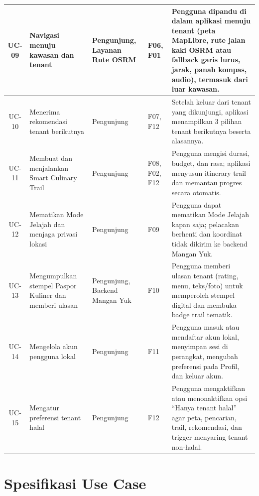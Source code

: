 \begin{longtable}{|C{0.10}|L{0.25}|L{0.14}|L{0.13}|L{0.38}|}
UC-09 & Navigasi menuju kawasan dan tenant & Pengunjung, Layanan Rute OSRM & F06, F01 & Pengguna dipandu di dalam aplikasi menuju tenant (peta MapLibre, rute jalan kaki OSRM atau fallback garis lurus, jarak, panah kompas, audio), termasuk dari luar kawasan. \\ \hline
UC-10 & Menerima rekomendasi tenant berikutnya & Pengunjung & F07, F12 & Setelah keluar dari tenant yang dikunjungi, aplikasi menampilkan 3 pilihan tenant berikutnya beserta alasannya. \\ \hline
UC-11 & Membuat dan menjalankan Smart Culinary Trail & Pengunjung & F08, F02, F12 & Pengguna mengisi durasi, budget, dan rasa; aplikasi menyusun itinerary trail dan memantau progres secara otomatis. \\ \hline
UC-12 & Mematikan Mode Jelajah dan menjaga privasi lokasi & Pengunjung & F09 & Pengguna dapat mematikan Mode Jelajah kapan saja; pelacakan berhenti dan koordinat tidak dikirim ke backend Mangan Yuk. \\ \hline
UC-13 & Mengumpulkan stempel Paspor Kuliner dan memberi ulasan & Pengunjung, Backend Mangan Yuk & F10 & Pengguna memberi ulasan tenant (rating, menu, teks/foto) untuk memperoleh stempel digital dan membuka badge trail tematik. \\ \hline
UC-14 & Mengelola akun pengguna lokal & Pengunjung & F11 & Pengguna masuk atau mendaftar akun lokal, menyimpan sesi di perangkat, mengubah preferensi pada Profil, dan keluar akun. \\ \hline
UC-15 & Mengatur preferensi tenant halal & Pengunjung & F12 & Pengguna mengaktifkan atau menonaktifkan opsi ``Hanya tenant halal'' agar peta, pencarian, trail, rekomendasi, dan trigger menyaring tenant non-halal. \\ \hline
\end{longtable}

\section{Spesifikasi Use Case}
\label{sec:spesifikasi-use-case}

